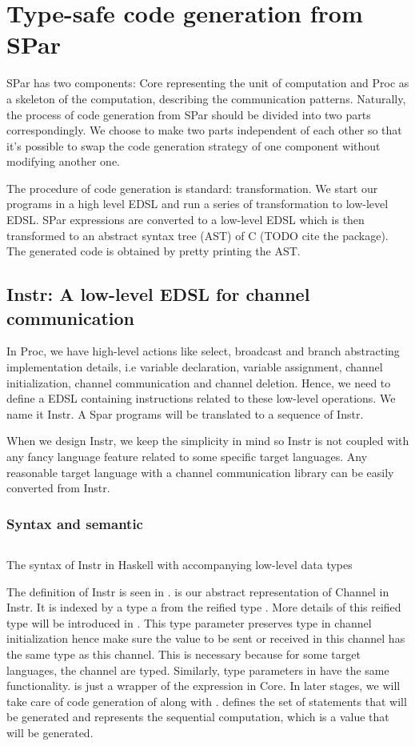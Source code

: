 \chapter{Type-safe code generation from SPar} \label{chap:cg}
SPar has two components: Core representing the unit of computation and Proc as a skeleton of the computation, describing the communication patterns. Naturally, the process of code generation from SPar should be divided into two parts correspondingly. We choose to make two parts independent of each other so that it's possible to swap the code generation strategy of one component without modifying another one.

The procedure of code generation is standard: transformation. We start our programs in a high level EDSL and run a series of transformation to low-level EDSL. SPar expressions are converted to a low-level EDSL which is then transformed to an abstract syntax tree (AST) of C (TODO cite the package). The generated code is obtained by pretty printing the AST.
\section{Instr: A low-level EDSL for channel communication}
In Proc, we have high-level actions like select, broadcast and branch abstracting implementation details, i.e variable declaration, variable assignment, channel initialization, channel communication and channel deletion. Hence, we need to define a EDSL containing instructions related to these low-level operations. We name it Instr. A Spar programs will be translated to a sequence of Instr. 

When we design Instr, we keep the simplicity in mind so Instr is not coupled with any fancy language feature related to some specific target languages. Any reasonable target language with a channel communication library can be easily converted from Instr.
\subsection{Syntax and semantic}
\begin{listing}
    \inputminted{Haskell}{codegen/instr.hs} 
    \caption{The syntax of Instr in Haskell with accompanying low-level data types}
    \label{codegen:code:instr}
\end{listing}
The definition of Instr is seen in .  is our abstract representation of Channel in Instr. It is indexed by a type a from the reified type . More details of this reified type will be introduced in . This type parameter preserves type in channel initialization hence make sure the value to be sent or received in this channel has the same type as this channel. This is necessary because for some target languages, the channel are typed. Similarly, type parameters in  have the same functionality.  is just a wrapper of the expression in Core. In later stages, we will take care of code generation of  along with .  defines the set of statements that will be generated and  represents the sequential computation, which is a value that will be generated.

